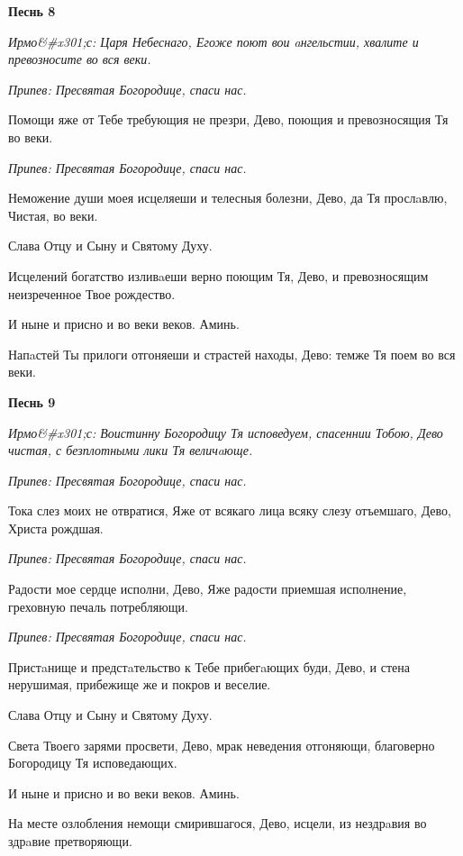 \bfseries Песнь 8\normalfont{}


\itshape Ирмо&#x301;с:\normalfont{} Царя Небеснаго, Егоже поют вои aнгельстии, хвалите и превозносите во вся веки.


\itshape Припев:\normalfont{} Пресвятая Богородице, спаси нас.


Помощи яже от Тебе требующия не презри, Дево, поющия и превозносящия Тя во веки.


\itshape Припев:\normalfont{} Пресвятая Богородице, спаси нас.


Неможение души моея исцеляеши и телесныя болезни, Дево, да Тя прослaвлю, Чистая, во веки.


Слава Отцу и Сыну и Святому Духу.


Исцелений богатство изливaеши верно поющим Тя, Дево, и превозносящим неизреченное Твое рождество.


И ныне и присно и во веки веков. Аминь.


Напaстей Ты прилоги отгоняеши и страстей находы, Дево: темже Тя поем во вся веки.




\bfseries Песнь 9\normalfont{}


\itshape Ирмо&#x301;с:\normalfont{} Воистинну Богородицу Тя исповедуем, спасеннии Тобою, Дево чистая, с безплотными лики Тя величaюще.


\itshape Припев:\normalfont{} Пресвятая Богородице, спаси нас.


Тока слез моих не отвратися, Яже от всякаго лица всяку слезу отъемшаго, Дево, Христа рождшая.


\itshape Припев:\normalfont{} Пресвятая Богородице, спаси нас.


Радости мое сердце исполни, Дево, Яже радости приемшая исполнение, греховную печаль потребляющи.


\itshape Припев:\normalfont{} Пресвятая Богородице, спаси нас.


Пристaнище и предстaтельство к Тебе прибегaющих буди, Дево, и стена нерушимая, прибежище же и покров и веселие.


Слава Отцу и Сыну и Святому Духу.


Света Твоего зарями просвети, Дево, мрак неведения отгоняющи, благоверно Богородицу Тя исповедающих.


И ныне и присно и во веки веков. Аминь.


На месте озлобления немощи смирившагося, Дево, исцели, из нездрaвия во здрaвие претворяющи.




